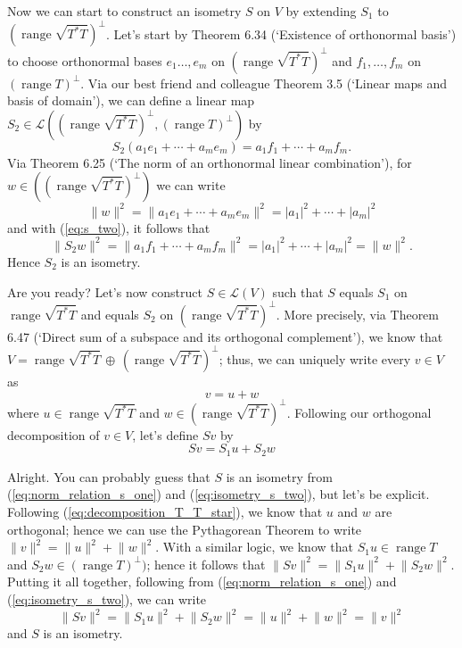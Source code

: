 \documentclass{article}
\providecommand{\abs}[1]{\lvert#1\rvert} \providecommand{\norm}[1]{\lVert#1\rVert}
\begin{document}
Now we can start to construct an isometry $S$ on $V$ by extending $S_1$ to $(\operatorname{range}\sqrt{T^*T})^\bot$. Let's start by Theorem 6.34 (`Existence of orthonormal basis') to choose orthonormal bases $e_1\ldots,e_m$ on $(\operatorname{range}\sqrt{T^*T})^\bot$ and $f_1,\ldots,f_m$ on $(\operatorname{range}T)^\bot$. Via our best friend and colleague Theorem 3.5 (`Linear maps and basis of domain'), we can define a linear map $S_2\in\mathcal{L}((\operatorname{range}\sqrt{T^*T})^\bot,(\operatorname{range}T)^\bot)$ by
\begin{equation}\label{eq:s_two}
    S_2(a_1e_1+\cdots+a_me_m)=a_1f_1+\cdots+a_mf_m.
\end{equation}
Via Theorem 6.25 (`The norm of an orthonormal linear combination'), for $w\in((\operatorname{range}\sqrt{T^*T})^\bot)$ we can write
\begin{equation*}
    \norm{w}^2=\norm{a_1e_1+\cdots+a_me_m}^2=\abs{a_1}^2+\cdots+\abs{a_m}^2
\end{equation*}
and with (\ref{eq:s_two}), it follows that
\begin{equation}\label{eq:isometry_s_two}
    \norm{S_2w}^2=\norm{a_1f_1+\cdots+a_mf_m}^2=\abs{a_1}^2+\cdots+\abs{a_m}^2=\norm{w}^2.
\end{equation}
Hence $S_2$ is an isometry.

Are you ready? Let's now construct $S\in\mathcal{L}(V)$ such that $S$ equals $S_1$ on $\operatorname{range}\sqrt{T^*T}$ and equals $S_2$ on $(\operatorname{range}\sqrt{T^*T})^\bot$. More precisely, via Theorem 6.47 (`Direct sum of a subspace and its orthogonal complement'), we know that $V=\operatorname{range}\sqrt{T^*T}\,\oplus\,(\operatorname{range}\sqrt{T^*T})^\bot$; thus, we can uniquely write every $v\in V$ as
\begin{equation}\label{eq:decomposition_T_T_star}
    v=u+w
\end{equation}
where $u\in\operatorname{range}\sqrt{T^*T}$ and $w\in(\operatorname{range}\sqrt{T^*T})^\bot$. Following our orthogonal decomposition of $v\in V$, let's define $Sv$ by
\begin{equation}\label{eq:definition_S}
    Sv=S_1u+S_2w
\end{equation}

Alright. You can probably guess that $S$ is an isometry from (\ref{eq:norm_relation_s_one}) and (\ref{eq:isometry_s_two}), but let's be explicit. Following (\ref{eq:decomposition_T_T_star}), we know that $u$ and $w$ are orthogonal; hence we can use the Pythagorean Theorem to write $\norm{v}^2=\norm{u}^2+\norm{w}^2$. With a similar logic, we know that $S_1u\in\operatorname{range}T$ and $S_2w\in(\operatorname{range}T)^\bot)$; hence it follows that $\norm{Sv}^2=\norm{S_1u}^2+\norm{S_2w}^2$. Putting it all together, following from (\ref{eq:norm_relation_s_one}) and (\ref{eq:isometry_s_two}), we can write
\begin{equation*}
    \norm{Sv}^2=\norm{S_1u}^2+\norm{S_2w}^2=\norm{u}^2+\norm{w}^2=\norm{v}^2
\end{equation*}
and $S$ is an isometry.
\end{document}
